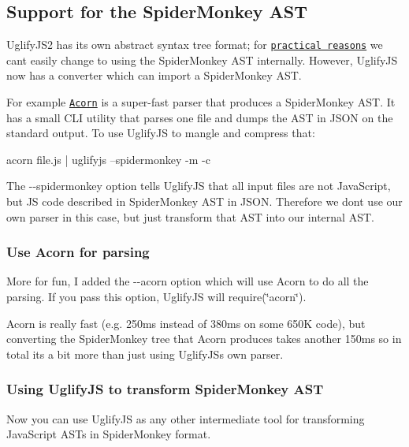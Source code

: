 \subsection*{Support for the Spider\+Monkey A\+ST}

Uglify\+J\+S2 has its own abstract syntax tree format; for \href{http://lisperator.net/blog/uglifyjs-why-not-switching-to-spidermonkey-ast/}{\tt practical reasons} we can\textquotesingle{}t easily change to using the Spider\+Monkey A\+ST internally. However, Uglify\+JS now has a converter which can import a Spider\+Monkey A\+ST.

For example \href{https://github.com/ternjs/acorn}{\tt Acorn} is a super-\/fast parser that produces a Spider\+Monkey A\+ST. It has a small C\+LI utility that parses one file and dumps the A\+ST in J\+S\+ON on the standard output. To use Uglify\+JS to mangle and compress that\+: \begin{DoxyVerb}acorn file.js | uglifyjs --spidermonkey -m -c
\end{DoxyVerb}


The {\ttfamily -\/-\/spidermonkey} option tells Uglify\+JS that all input files are not Java\+Script, but JS code described in Spider\+Monkey A\+ST in J\+S\+ON. Therefore we don\textquotesingle{}t use our own parser in this case, but just transform that A\+ST into our internal A\+ST.

\subsubsection*{Use Acorn for parsing}

More for fun, I added the {\ttfamily -\/-\/acorn} option which will use Acorn to do all the parsing. If you pass this option, Uglify\+JS will {\ttfamily require(\char`\"{}acorn\char`\"{})}.

Acorn is really fast (e.\+g. 250ms instead of 380ms on some 650K code), but converting the Spider\+Monkey tree that Acorn produces takes another 150ms so in total it\textquotesingle{}s a bit more than just using Uglify\+JS\textquotesingle{}s own parser.

\subsubsection*{Using Uglify\+JS to transform Spider\+Monkey A\+ST}

Now you can use Uglify\+JS as any other intermediate tool for transforming Java\+Script A\+S\+Ts in Spider\+Monkey format.

